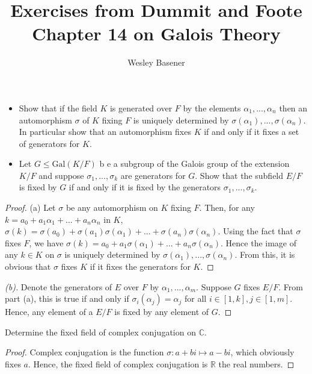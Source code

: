 \documentclass[10pt]{article}
\newcommand{\R}{\mathbb{R}}
\newcommand{\C}{\mathbb{C}}
\newenvironment{problem}[2][Problem]{\begin{trivlist}
		\item[\hskip \labelsep {\bfseries #1}\hskip \labelsep {\bfseries #2.}]}{\end{trivlist}}
\begin{document}
	
	\title{Exercises from Dummit and Foote Chapter 14 on Galois Theory}
	\author{Wesley Basener}
	\maketitle
	
	\begin{problem}{1.1}
		\begin{itemize}
			\item[\textbf{(a)}]
				Show that if the field $K$ is generated over $F$ by the elements $\alpha_1, ..., \alpha_n$ then an
				automorphism $\sigma$ of $K$ fixing $F$ is uniquely determined by $\sigma (\alpha_1), ..., \sigma (\alpha_n )$. In
				particular show that an automorphism fixes $K$ if and only if it fixes a set of generators
				for $K$.
			\item[\textbf{(b)}]
				Let $G \leq \text{Gal}(K/F)$ b e a subgroup of the Galois group of the extension $K/F$ and
				suppose $\sigma_1, ..., \sigma_k$ are generators for $G$. Show that the subfield $E/F$ is fixed by $G$ if
				and only if it is fixed by the generators $\sigma_1, ..., \sigma_k$.
		\end{itemize}
		\begin{proof}{(a)}
			  Let $\sigma$ be any automorphism on $K$ fixing $F$. Then, for any $k = a_0 + a_1\alpha_1 + ... + a_n\alpha_n$ in $K$, $\sigma(k) = \sigma(a_0) + \sigma(a_1)\sigma(\alpha_1) + ... + \sigma(a_n)\sigma(\alpha_n)$. Using the fact that $\sigma$ fixes $F$, we have $\sigma(k) = a_0 + a_1\sigma(\alpha_1) + ... + a_n\sigma(\alpha_n)$. Hence the image of any $k \in K$ on $\sigma$ is uniquely determined by $\sigma (\alpha_1), ..., \sigma (\alpha_n )$.
			  From this, it is obvious that $\sigma$ fixes $K$ if it fixes the generators for $K$.
		\end{proof}
		\begin{proof}[(b)]
			Denote the generators of $E$ over $F$ by $\alpha_1, ..., \alpha_m$. Suppose $G$ fixes $E/F$. From part (a), this is true if and only if $\sigma_i(\alpha_j) = \alpha_j$ for all $i \in [1,k], j \in [1,m]$. Hence, any element of a $E/F$ is fixed by any element of $G$.
		\end{proof}
	\end{problem}
	
	\begin{problem}{1.3}
		Determine the fixed field of complex conjugation on $\C$.
		\begin{proof}
			Complex conjugation is the function $\sigma : a+bi \mapsto a-bi$, which obviously fixes $a$. Hence, the fixed field of complex conjugation is $\R$ the real numbers.
		\end{proof}
	\end{problem}
	
\end{document}
